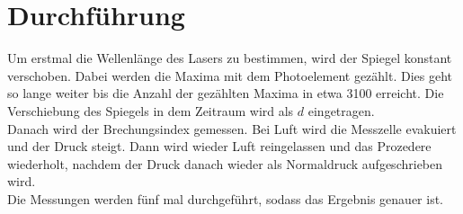 \section{Durchführung}
\label{sec:Durchfuehrung}


Um erstmal die Wellenlänge des Lasers zu bestimmen, wird der Spiegel konstant verschoben. Dabei werden die Maxima mit dem Photoelement gezählt. Dies geht so lange weiter bis die Anzahl der gezählten Maxima in etwa 3100 erreicht. Die Verschiebung des Spiegels in dem Zeitraum wird als \(d\) eingetragen.\\
Danach wird der Brechungsindex gemessen. Bei Luft wird die Messzelle evakuiert und der Druck steigt. Dann wird wieder Luft reingelassen und das Prozedere wiederholt, nachdem der Druck danach wieder als Normaldruck aufgeschrieben wird.\\
Die Messungen werden fünf mal durchgeführt, sodass das Ergebnis genauer ist.